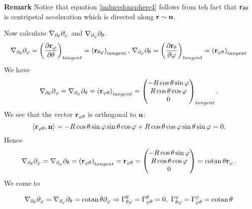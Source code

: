 \documentclass[12pt]{article}
\theoremstyle{theorem}
\numberwithin{equation}{section}
\begin{document}
{\bf Remark}  Notice that equation \eqref{inducedonsphere4}
follows from teh fact that ${\bf r}_{\theta\theta}$
is centripetal acceleration which is directed along 
${\bf r}\sim {\bf n}$.

\smallskip 



Now calculate $\nabla_{\partial_\theta}\partial_\varphi$ and $\nabla_{\partial_\varphi}\partial_\theta$.
\begin{equation*}
    \nabla_{\partial_\theta}\partial_\varphi=\left({\partial {\bf r}_\varphi\over \partial\theta}\right)_{tangent}=
    \left({\bf r}_{\theta\varphi}\right)_{tangent},\,
    \nabla_{\partial_\varphi}\partial_\theta=\left({\partial {\bf r}_\theta\over \partial\varphi}\right)_{tangent}=
    \left({\bf r}_{\varphi\theta}\right)_{tangent}
\end{equation*}
 We have
           $$
           \nabla_{\partial_\theta}\partial_\varphi=\nabla_{\partial_\varphi}\partial_\theta=\left({\bf r}_{\varphi\theta}\right)_{tangent}=
           \begin{pmatrix}
            -R\cos\theta\sin\varphi\cr
            R\cos\theta\cos\varphi\cr
            0\cr
                  \end{pmatrix}_{tangent}.
           $$
We see that the vector ${\bf r}_{\varphi\theta}$ is orthogonal to ${\bf n}$:
\begin{equation*}
     \langle{\bf r}_{\varphi\theta},{\bf n}\rangle=-R\cos\theta\sin\varphi \sin\theta\cos\varphi+
     R\cos\theta\cos\varphi\sin\theta\sin\varphi=0.
\end{equation*}
Hence
\begin{equation*}
 \nabla_{\partial_\theta}\partial_\varphi=\nabla_{\partial_\varphi}\partial_\theta=
 \left({\bf r}_{\varphi\theta}\right)_{tangent}={\bf r}_{\varphi\theta}=
 \begin{pmatrix}
            -R\cos\theta\sin\varphi\cr
            R\cos\theta\cos\varphi\cr
            0\cr
                  \end{pmatrix}=
                  {\rm cotan\,}\theta  {\bf r}_\varphi\,.
\end{equation*}
We come to

\begin{equation}\label{inducedonsphere8}
    \nabla_{\partial_\theta}\partial_\varphi=\nabla_{\partial_\varphi}\partial_\theta={\rm cotan\,}\theta  \partial_\varphi \Rightarrow
    \Gamma^\theta_{\theta\varphi}=\Gamma^\theta_{\varphi\theta}=0,\,\,
    \Gamma^\varphi_{\theta\varphi}=\Gamma^\varphi_{\varphi\theta}={\rm cotan\,}\theta
\end{equation}
\end{document}
